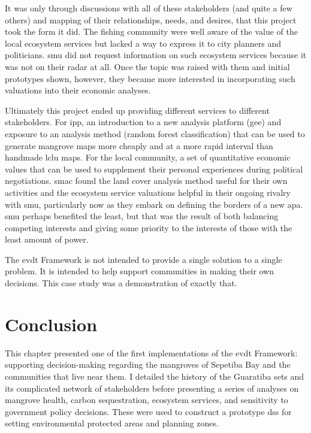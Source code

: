It was only through discussions with all of these stakeholders (and quite a few others) and mapping of their relationships, needs, and desires, that this project took the form it did. The fishing community were well aware of the value of the local ecosystem services but lacked a way to express it to city planners and politicians. \ac{smu} did not request information on such ecosystem services because it was not on their radar at all. Once the topic was raised with them and initial prototypes shown, however, they became more interested in incorporating such valuations into their economic analyses. 

Ultimately this project ended up providing different services to different stakeholders. For \ac{ipp}, an introduction to a new analysis platform (\ac{gee}) and exposure to an analysis method (random forest classification) that can be used to generate mangrove maps more cheaply and at a more rapid interval than handmade \ac{lclu} maps. For the local community, a set of quantitative economic values that can be used to supplement their personal experiences during political negotiations. \ac{smac} found the land cover analysis method useful for their own activities and the ecosystem service valuations helpful in their ongoing rivalry with \ac{smu}, particularly now as they embark on defining the borders of a new \ac{apa}. \ac{smu} perhaps benefited the least, but that was the result of both balancing competing interests and giving some priority to the interests of those with the least amount of power.

The \ac{evdt} Framework is not intended to provide a single solution to a single problem. It is intended to help support communities in making their own decisions. This case study was a demonstration of exactly that.


\section{Conclusion}

This chapter presented one of the first implementations of the \ac{evdt} Framework: supporting decision-making regarding the mangroves of Sepetiba Bay and the communities that live near them. I detailed the history of the Guaratiba \ac{sets} and its complicated network of stakeholders before presenting a series of analyses on mangrove health, carbon sequestration, ecosystem services, and sensitivity to government policy decisions. These were used to construct a prototype \ac{dss} for setting environmental protected areas and planning zones. 

